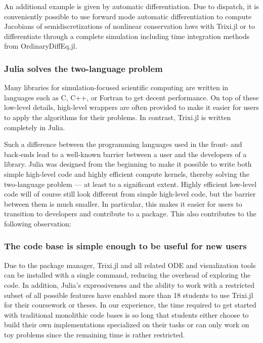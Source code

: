 \documentclass{juliacon}
\newcommand{\trixi}{Trixi.jl\xspace}
\begin{document}
An additional example is given by automatic differentiation. Due to dispatch,
it is conveniently possible to use forward mode automatic differentiation
\cite{revels2016forward} to compute Jacobians of semidiscretizations of nonlinear
conservation laws with \trixi or to differentiate through a complete simulation
including time integration methods from OrdinaryDiffEq.jl.

\subsubsection{Julia solves the two-language problem}

Many libraries for simulation-focused scientific computing are written in
languages such as C, C++, or Fortran to get decent performance. On top of these
low-level details, high-level wrappers are often provided to make it easier
for users to apply the algorithms for their problems. In contrast, \trixi is
written completely in Julia.

Such a difference between the programming languages used in the front- and
back-ends lead to a well-known barrier between a user and the developers of a library.
Julia was designed from the beginning to make it possible to write both simple
high-level code and highly efficient compute kernels, thereby solving the
two-language problem --- at least to a significant extent. Highly efficient low-level
code will of course still look different from simple high-level code, but the
barrier between them is much smaller. In particular, this makes it easier for
users to transition to developers and contribute to a package. This also contributes
to the following observation:

\subsubsection{The code base is simple enough to be useful for new users}

Due to the package manager, \trixi and all related ODE and visualization tools
can be installed with a single command, reducing the overhead of exploring the
code. In addition, Julia's expressiveness and the ability to work with a restricted
subset of all possible features have enabled more than 18 students to use \trixi
for their coursework or theses. In our experience, the time required to get
started with traditional monolithic code bases is so long that students either
choose to build their own implementations specialized on their tasks or can only
work on toy problems since the remaining time is rather restricted. 
\end{document}
